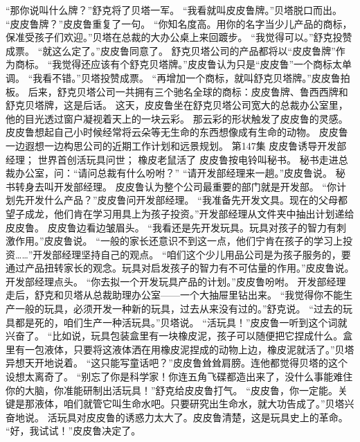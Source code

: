 \documentclass[a4paper,12pt,UTF8,twoside]{ctexbook}
\begin{document}
        “那你说叫什么牌？”舒克将了贝塔一军。 
        “我看就叫皮皮鲁牌。”贝塔脱口而出。 
        “皮皮鲁牌？”皮皮鲁重复了一句。 
        “你知名度高。用你的名字当少儿产品的商标，保准受孩子们欢迎。”贝塔在总裁的大办公桌上来回踱步。 
        “我觉得可以。”舒克投赞成票。 
        “就这么定了。”皮皮鲁同意了。 
        舒克贝塔公司的产品都将以“皮皮鲁牌”作为商标。 
        “我觉得还应该有个舒克贝塔牌。”皮皮鲁认为只是“皮皮鲁”一个商标太单调。 
        “我看不错。”贝塔投赞成票。 
        “再增加一个商标，就叫舒克贝塔牌。”皮皮鲁拍板。 
        后来，舒克贝塔公司一共拥有三个驰名全球的商标：皮皮鲁牌、鲁西西牌和舒克贝塔牌，这是后话。 
        这天，皮皮鲁坐在舒克贝塔公司宽大的总裁办公室里，他的目光透过窗户凝视着天上的一块云彩。 
        那云彩的形状触发了皮皮鲁的灵感。 
        皮皮鲁想起自己小时候经常将云朵等无生命的东西想像成有生命的动物。 
        皮皮鲁一边遐想一边构思公司的近期工作计划和远景规划。   第147集 
        皮皮鲁诱导开发部经理； 
        世界首创活玩具问世； 
        橡皮老鼠活了   
        皮皮鲁按电铃叫秘书。 
        秘书走进总裁办公室，问：“请问总裁有什么吩咐？” 
        “请开发部经理来一趟。”皮皮鲁说。 
        秘书转身去叫开发部经理。 
        皮皮鲁认为整个公司最重要的部门就是开发部。 
        “你计划先开发什么产品？”皮皮鲁问开发部经理。 
        “我准备先开发文具。现在的父母都望子成龙，他们肯在学习用具上为孩子投资。”开发部经理从文件夹中抽出计划递给皮皮鲁。 
        皮皮鲁边看边皱眉头。 
        “我看还是先开发玩具。玩具对孩子的智力有刺激作用。”皮皮鲁说。 
        “一般的家长还意识不到这一点，他们宁肯在孩子的学习上投资……”开发部经理坚持自己的观点。 
        “咱们这个少儿用品公司是为孩子服务的，要通过产品扭转家长的观念。玩具对启发孩子的智力有不可估量的作用。”皮皮鲁说。 
        开发部经理点头。 
        “你去拟一个开发玩具产品的计划。”皮皮鲁吩咐。 
        开发部经理走后，舒克和贝塔从总裁助理办公室——一个大抽屉里钻出来。 
        “我觉得你不能生产一般的玩具，必须开发一种新的玩具，过去从来没有过的。”舒克说。 
        “过去的玩具都是死的，咱们生产一种活玩具。”贝塔说。 
        “活玩具！”皮皮鲁一听到这个词就兴奋了。 
        “比如说，玩具包装盒里有一块橡皮泥，孩子可以随便把它捏成什么。盒里有一包液体，只要将这液体洒在用橡皮泥捏成的动物上边，橡皮泥就活了。”贝塔异想天开地说着。 
        “这只能写童话吧？”皮皮鲁耸耸肩膀。连他都觉得贝塔的这个设想太离奇了。 
        “别忘了你是科学家！你连五角飞碟都造出来了，没什么事能难住你的大脑，你准能研制出活玩具！”舒克给皮皮鲁打气。 
        “皮皮鲁，你一定能。关键是那液体，咱们就管它叫生命水吧。只要研究出生命水，就大功告成了。”贝塔兴奋地说。 
        活玩具对皮皮鲁的诱惑力太大了。皮皮鲁清楚，这是玩具史上的革命。 
        “好，我试试！”皮皮鲁决定了。 
\end{document}
